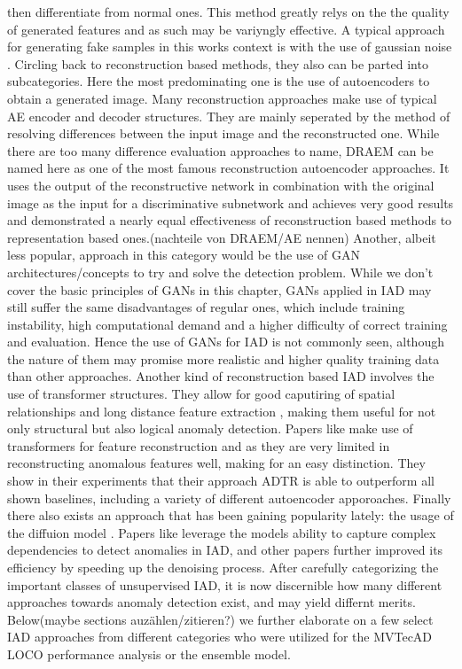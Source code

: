 then differentiate from normal ones. This method greatly relys on the the quality of generated features and as such may be variyngly effective. A typical approach for generating fake samples 
in this works context is with the use of gaussian noise \cite{liu2023simplenet}.
\newline
Circling back to reconstruction based methods, they also can be parted into subcategories. Here the most predominating one is the use of autoencoders to obtain a generated image. Many 
reconstruction approaches make use of typical AE encoder and decoder structures. They are mainly seperated by the method of resolving differences between the input image and the reconstructed one. 
While there are too many difference evaluation approaches to name, DRAEM \cite{Zavrtanik_2021DRAEM} can be named here as one of the most famous reconstruction autoencoder approaches. It uses 
the output of the reconstructive network in combination with the original image as the input for a discriminative subnetwork and achieves very good results and demonstrated a nearly equal effectiveness 
of reconstruction based methods to representation based ones.(nachteile von DRAEM/AE nennen)
Another, albeit less popular, approach in this category would be the use of GAN architectures/concepts to try and solve the detection problem. While we don't cover the basic principles of GANs in 
this chapter, GANs applied in IAD may still suffer the same disadvantages of regular ones, which include training instability, high computational demand and a higher difficulty of correct training and 
evaluation. Hence the use of GANs for IAD is not commonly seen, although the nature of them may promise more realistic and higher quality training data than other approaches.
Another kind of reconstruction based IAD involves the use of transformer structures. They allow for good caputiring of spatial relationships and long distance feature extraction \cite{xie2020benchmarking},
making them useful for not only structural but also logical anomaly detection. Papers like \cite{You_2023transformer} make use of transformers for feature reconstruction and as they are very 
limited in reconstructing anomalous features well, making for an easy distinction. They show in their experiments that their approach ADTR is able to outperform all shown baselines, including 
a variety of different autoencoder apporoaches.
Finally there also exists an approach that has been gaining popularity lately: the usage of the diffuion model \cite{ho2020denoisingdiffusionOG}. Papers like \cite{Wyatt_2022diffusionfirstapproach} 
leverage the models ability to capture complex dependencies to detect anomalies in IAD, and other papers \cite{zhang2023diffusionaddiffusionmodern} further improved its efficiency by speeding up 
the denoising process.
\newline
After carefully categorizing the important classes of unsupervised IAD, it is now discernible how many different approaches towards anomaly detection exist, and may yield differnt merits. 
Below(maybe sections auzählen/zitieren?) we further elaborate on a few select IAD approaches from different categories who were utilized for the MVTecAD LOCO performance analysis or the ensemble 
model. 



